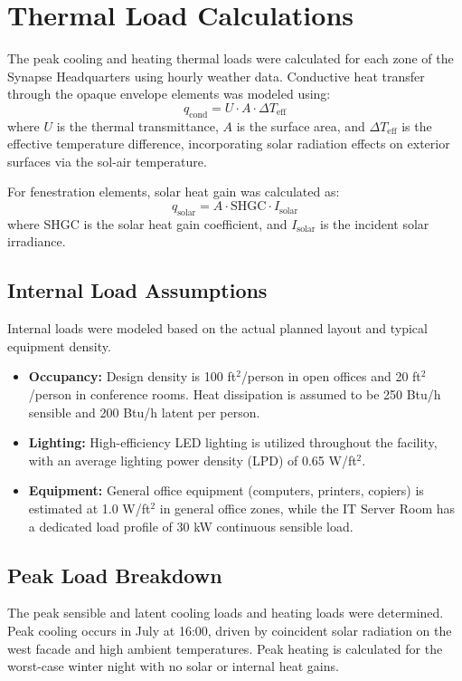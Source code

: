 \section{Thermal Load Calculations}
\label{sec:load_calculations}

The peak cooling and heating thermal loads were calculated for each zone of the Synapse Headquarters using hourly weather data. Conductive heat transfer through the opaque envelope elements was modeled using:
\begin{equation}
q_{\text{cond}} = U \cdot A \cdot \Delta T_{\text{eff}}
\end{equation}
where $U$ is the thermal transmittance, $A$ is the surface area, and $\Delta T_{\text{eff}}$ is the effective temperature difference, incorporating solar radiation effects on exterior surfaces via the sol-air temperature.

For fenestration elements, solar heat gain was calculated as:
\begin{equation}
q_{\text{solar}} = A \cdot \text{SHGC} \cdot I_{\text{solar}}
\end{equation}
where SHGC is the solar heat gain coefficient, and $I_{\text{solar}}$ is the incident solar irradiance.

\subsection{Internal Load Assumptions}
Internal loads were modeled based on the actual planned layout and typical equipment density.
\begin{itemize}
  \item \textbf{Occupancy:} Design density is 100 ft$^{2}$/person in open offices and 20 ft$^{2}$/person in conference rooms. Heat dissipation is assumed to be 250 Btu/h sensible and 200 Btu/h latent per person.
  \item \textbf{Lighting:} High-efficiency LED lighting is utilized throughout the facility, with an average lighting power density (LPD) of 0.65 W/ft$^{2}$.
  \item \textbf{Equipment:} General office equipment (computers, printers, copiers) is estimated at 1.0 W/ft$^{2}$ in general office zones, while the IT Server Room has a dedicated load profile of 30 kW continuous sensible load.
\end{itemize}

\subsection{Peak Load Breakdown}
The peak sensible and latent cooling loads and heating loads were determined. Peak cooling occurs in July at 16:00, driven by coincident solar radiation on the west facade and high ambient temperatures. Peak heating is calculated for the worst-case winter night with no solar or internal heat gains.

